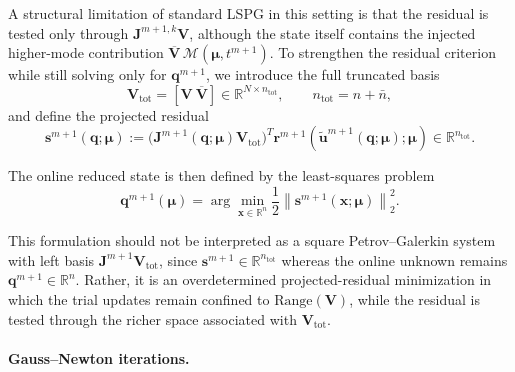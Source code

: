 \documentclass[11pt]{article}
\begin{document}
A structural limitation of standard LSPG in this setting is that the residual
is tested only through \(\mathbf J^{m+1,k}\mathbf V\), although the state itself
contains the injected higher-mode contribution
\(\overline{\mathbf V}\,\mathcal M(\bm\mu,t^{m+1})\). To strengthen the residual
criterion while still solving only for \(\mathbf q^{m+1}\), we introduce the
full truncated basis
\[
\mathbf V_{\mathrm{tot}}=[\mathbf V\ \overline{\mathbf V}]
\in\mathbb R^{N\times n_{\mathrm{tot}}},
\qquad n_{\mathrm{tot}}=n+\bar n,
\]
and define the projected residual
\begin{equation}
\mathbf s^{m+1}(\mathbf q;\bm\mu)
:=
\bigl(\mathbf J^{m+1}(\mathbf q;\bm\mu)\mathbf V_{\mathrm{tot}}\bigr)^T
\mathbf r^{m+1}\!\left(
\tilde{\mathbf u}^{m+1}(\mathbf q;\bm\mu);\bm\mu
\right)
\in\mathbb R^{n_{\mathrm{tot}}}.
\label{eq:case2_enriched_projected_residual_short}
\end{equation}

The online reduced state is then defined by the least-squares problem
\begin{equation}
\mathbf q^{m+1}(\bm\mu)
=
\arg\min_{\mathbf x\in\mathbb R^n}
\frac12
\left\|
\mathbf s^{m+1}(\mathbf x;\bm\mu)
\right\|_2^2.
\label{eq:case2_enriched_min_problem_short}
\end{equation}

This formulation should not be interpreted as a square Petrov--Galerkin system
with left basis \(\mathbf J^{m+1}\mathbf V_{\mathrm{tot}}\), since
\(\mathbf s^{m+1}\in\mathbb R^{n_{\mathrm{tot}}}\) whereas the online unknown
remains \(\mathbf q^{m+1}\in\mathbb R^n\). Rather, it is an overdetermined
projected-residual minimization in which the trial updates remain confined to
\(\mathrm{Range}(\mathbf V)\), while the residual is tested through the richer
space associated with \(\mathbf V_{\mathrm{tot}}\).

\paragraph{Gauss--Newton iterations.}
\end{document}
